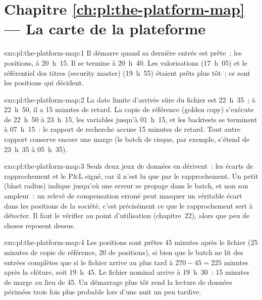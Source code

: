 \section*{Chapitre \ref{ch:pl:the-platform-map} --- La carte de la plateforme}

\begin{solution}{exo:pl:the-platform-map:1}
Il démarre quand sa dernière entrée est prête~: les positions, à 20~h~15. Il se termine à 20~h~40. Les valorisations (17~h~05) et le référentiel des titres (security master)
(19~h~55) étaient prêts plus tôt~; ce sont les positions qui décident.
\end{solution}

\begin{solution}{exo:pl:the-platform-map:2}
La date limite d'arrivée sûre du fichier est 22~h~35~; à 22~h~50, il a 15 minutes de retard. La copie de référence (golden copy) s'exécute de 22~h~50 à 23~h~15, les variables
jusqu'à 01~h~15, et les backtests se terminent à 07~h~15~: le rapport de recherche accuse 15 minutes de retard. Tout autre rapport conserve encore une marge (le
batch de risque, par exemple, s'étend de 23~h~35 à 05~h~35).
\end{solution}

\begin{solution}{exo:pl:the-platform-map:3}
Seuls deux jeux de données en dérivent~: les écarts de rapprochement et le P\&L signé, car il n'est lu que par le rapprochement.
Un petit  (blast radius) indique jusqu'où une erreur se propage dans le batch, et non son ampleur~: un relevé de compensation erroné peut
masquer un véritable écart dans les positions de la société, c'est précisément ce que le rapprochement sert à détecter. Il faut le vérifier au
point d'utilisation (chapitre~22), alors que peu de choses reposent dessus.
\end{solution}

\begin{solution}{exo:pl:the-platform-map:4}
Les positions sont prêtes 45 minutes après le fichier (25 minutes de copie de référence, 20 de positions), si bien que le batch
ne lit des entrées complètes que si le fichier arrive au plus tard à $270 - 45 = 225$ minutes après la clôture, soit 19~h~45. Le fichier nominal arrive à 19~h~30~: 15 minutes
de marge au lieu de 45. Un démarrage plus tôt rend la lecture de données périmées trois fois plus probable lors d'une nuit un peu tardive.
\end{solution}

